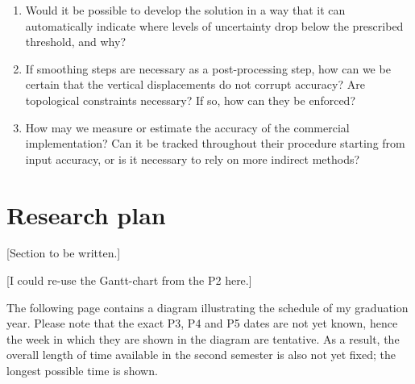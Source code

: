 \begin{enumerate}
\begin{enumerate}
        \item Would it be possible to develop the solution in a way that it can automatically indicate where levels of uncertainty drop below the prescribed threshold, and why?
        \item If smoothing steps are necessary as a post-processing step, how can we be certain that the vertical displacements do not corrupt accuracy? Are topological constraints necessary? If so, how can they be enforced?
        \item How may we measure or estimate the accuracy of the commercial implementation? Can it be tracked throughout their procedure starting from input accuracy, or is it necessary to rely on more indirect methods?
    \end{enumerate}
\end{enumerate}

\section{Research plan}
\label{sec:rq}

[Section to be written.]

[I could re-use the Gantt-chart from the P2 here.]

The following page contains a diagram illustrating the schedule of my graduation year. Please note that the exact P3, P4 and P5 dates are not yet known, hence the week in which they are shown in the diagram are tentative. As a result, the overall length of time available in the second semester is also not yet fixed; the longest possible time is shown.


